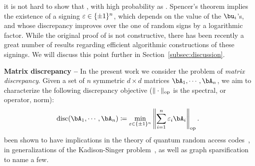 it is not hard to show that , 
with high probability as . Spencer's theorem  implies the existence of a signing $\varepsilon \in \{\pm 1\}^n$, 
which depends on the value of the $\bu_i$'s, and whose discrepancy  improves over the one of random signs by a logarithmic factor.
While the original proof of \cite{spencer1985six} is not constructive, there has been recently a great number of results regarding efficient algorithmic constructions of 
these signings. We will discuss this point further in Section~\ref{subsec:discussion}.

\myskip 
\textbf{Matrix discrepancy --}
In the present work we consider the problem of \emph{matrix discrepancy}. Given a set of $n$ symmetric $d \times d$ matrices $\bA_1, \cdots, \bA_n$, 
we aim to characterize the following discrepancy objective ($\|\cdot\|_{\mathrm{op}}$ is the spectral, or operator, norm):
\begin{equation}
    \label{eq:def_disc}
    \disc(\bA_1, \cdots, \bA_n) \coloneqq \min_{\eps \in \{\pm 1\}^n} \left\| \sum_{i=1}^n \eps_i \bA_i \right\|_\op.
\end{equation}
been shown to have implications in the theory of quantum random access codes~\citep{hopkins2022matrix,bansal2023resolving}, 
in generalizations of the Kadison-Singer problem~\citep{marcus2015interlacing,kyng2020four}, as well as 
graph sparsification~\citep{batson2014twice} to name a few.

